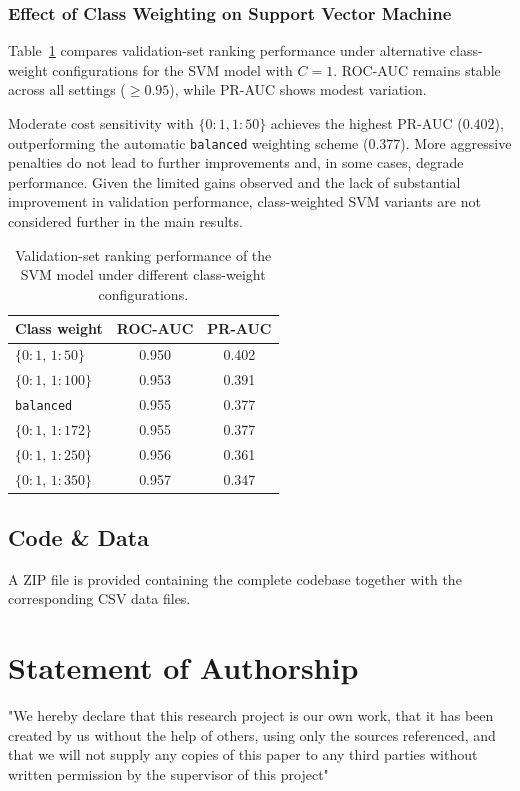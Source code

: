 \documentclass[oneside,12pt,parskip=half,american,numbers=noenddot]{scrreprt}
\begin{document}
\subsection{Effect of Class Weighting on Support Vector Machine}
Table~\ref{tab:svm_weight_results} compares validation-set ranking performance under alternative class-weight configurations for the SVM model with $C=1$. ROC-AUC remains stable across all settings ($\ge 0.95$), while PR-AUC shows modest variation.

Moderate cost sensitivity with $\{0\!:\!1,1\!:\!50\}$ achieves the highest PR-AUC ($0.402$), outperforming the automatic \texttt{balanced} weighting scheme ($0.377$). More aggressive penalties do not lead to further improvements and, in some cases, degrade performance. Given the limited gains observed and the lack of substantial improvement in validation performance, class-weighted SVM variants are not considered further in the main results.

\begin{table}[H]
\centering
\caption{Validation-set ranking performance of the SVM model under different class-weight configurations.}
\label{tab:svm_weight_results}
\small
\renewcommand{\arraystretch}{1.2}
\begin{tabular}{lcc}
\hline
\textbf{Class weight} & \textbf{ROC-AUC} & \textbf{PR-AUC} \\
\hline
$\{0\!:\!1,\,1\!:\!50\}$   & 0.950 & 0.402 \\
$\{0\!:\!1,\,1\!:\!100\}$  & 0.953 & 0.391 \\
\texttt{balanced}          & 0.955 & 0.377 \\
$\{0\!:\!1,\,1\!:\!172\}$  & 0.955 & 0.377 \\
$\{0\!:\!1,\,1\!:\!250\}$  & 0.956 & 0.361 \\
$\{0\!:\!1,\,1\!:\!350\}$  & 0.957 & 0.347 \\
\hline
\end{tabular}
\end{table}

\section{Code \& Data}
A ZIP file is provided containing the complete codebase together with the corresponding CSV data files.

\chapter{Statement of Authorship}
\vspace{1cm}
"We hereby declare that this research project is our own work, that it has been created by us without the help of others, using only the sources referenced, and that we will not supply any copies of this paper to any third parties without written permission by the supervisor of this project"
\end{document}
